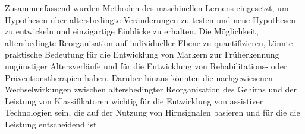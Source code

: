 Zusammenfassend wurden Methoden des maschinellen Lernens eingesetzt, um Hypothesen über altersbedingte Veränderungen zu testen und neue Hypothesen zu entwickeln und einzigartige Einblicke zu erhalten. Die Möglichkeit, altersbedingte Reorganisation auf individueller Ebene zu quantifizieren, könnte praktische Bedeutung für die Entwicklung von Markern zur Früherkennung ungünstiger Altersverläufe und für die Entwicklung von Rehabilitations- oder Präventionstherapien haben. Darüber hinaus könnten die nachgewiesenen Wechselwirkungen zwischen altersbedingter Reorganisation des Gehirns und der Leistung von Klassifikatoren wichtig für die Entwicklung von assistiver Technologien sein, die auf der Nutzung von Hirnsignalen basieren und für die die Leistung entscheidend ist.

